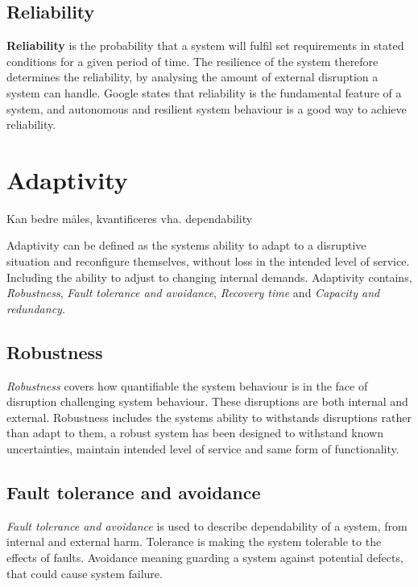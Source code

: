 \subsection{Reliability}
\textbf{Reliability} is the probability that a system will fulfil set requirements in stated conditions for a given period of time\cite{o2012practical}. The resilience of the system therefore determines the reliability, by analysing the amount of external disruption a system can handle. Google states that reliability is the fundamental feature of a system, and autonomous and resilient system behaviour is a good way to achieve reliability\cite[p. 84]{beyer2016siteReliabilityEngineering}.


\section{Adaptivity}
Kan bedre måles, kvantificeres vha. dependability

Adaptivity can be defined as the systems ability to adapt to a disruptive situation and reconfigure themselves, without loss in the intended level of service. Including the ability to adjust to changing internal demands\cite{reed2009methodology}. Adaptivity contains, \textit{Robustness}, \textit{Fault tolerance and avoidance}, \textit{Recovery time} and \textit{Capacity and redundancy}.

\subsection{Robustness}



\textit{Robustness} covers how quantifiable the system behaviour is in the face of disruption challenging system behaviour\cite[p. 10]{sterbenz2010resilience}. These disruptions are both internal and external\cite{omer2013resilience}. Robustness includes the systems ability to withstands disruptions rather than adapt to them, a robust system has been designed to withstand known uncertainties, maintain intended level of service and same form of functionality.

\subsection{Fault tolerance and avoidance}
\textit{Fault tolerance and avoidance} is used to describe dependability of a system, from internal and external harm. Tolerance is making the system tolerable to the effects of faults. Avoidance meaning guarding a system against potential defects, that could cause system failure\cite{strigini2012fault}.

